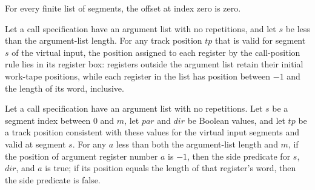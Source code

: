\begin{lemma}
\label{Complexity.LogProg.off_zero}
\leanok
{}
For every finite list of segments, the offset at index zero is zero.
\end{lemma}

\begin{lemma}
\label{Complexity.LogProg.regPos_box}
\leanok
{}
Let a call specification have an argument list with no repetitions, and let $s$ be less
than the argument-list length. For any track position $tp$ that is valid for segment $s$
of the virtual input, the position assigned to each register by the call-position rule
lies in its register box: registers outside the argument list retain their initial
work-tape positions, while each register in the list has position between $-1$ and the
length of its word, inclusive.
\end{lemma}

\begin{lemma}
\label{Complexity.LogProg.regPos_side}
\leanok
{}
Let a call specification have an argument list with no repetitions. Let $s$ be a segment
index between $0$ and $m$, let $par$ and $dir$ be Boolean values, and let $tp$ be a
track position consistent with these values for the virtual input segments and valid at
segment $s$. For any $a$ less than both the argument-list length and $m$, if the
position of argument register number $a$ is $-1$, then the side predicate for $s$,
$dir$, and $a$ is true; if its position equals the length of that register's word, then
the side predicate is false.
\end{lemma}

